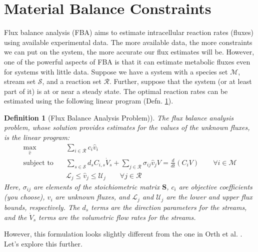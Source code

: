 \documentclass{article}[11pt]
\newtheorem{defn}{Definition}
\begin{document}
\section{Material Balance Constraints}\label{sec-material-balance}
Flux balance analysis (FBA) aims to estimate intracellular reaction rates (fluxes) using available experimental data.
The more available data, the more constraints we can put on the system, the more accurate our flux estimates will be.
However, one of the powerful aspects of FBA is that it can estimate metabolic fluxes even for systems with little data.
Suppose we have a system with a species set $\mathcal{M}$, stream set $\mathcal{S}$, and a reaction set $\mathcal{R}$. 
Further, suppose that the system (or at least part of it) is at or near a steady state. 
The optimal reaction rates can be estimated using the following linear program (Defn. \ref{defn-fba-concentration}).
\begin{mdframed}
\begin{defn}[Flux Balance Analysis Problem)]\label{defn-fba-concentration}
The flux balance analysis problem, whose solution provides estimates for the values of the unknown fluxes, is the linear program: 
\begin{align*}
\max_{\hat{v}}\quad&  \sum_{i\in\mathcal{R}}c_{i}\hat{v}_{i}\\
\text{subject to}\quad & \sum_{s\in\mathcal{S}}d_{s}C_{i,s}\dot{V}_{s} + \sum_{j\in\mathcal{R}}\sigma_{ij}\hat{v}_{j}V = \frac{d}{dt}\left(C_{i}V\right)\qquad\forall{i\in\mathcal{M}}\\
& \mathcal{L}_{j}\leq\hat{v}_{j}\leq\mathcal{U}_{j}\qquad\forall{j\in\mathcal{R}}
\end{align*}
Here, $\sigma_{ij}$ are elements of the stoichiometric matrix $\mathbf{S}$, $c_{i}$ are objective coefficients (you choose), $\hat{v}_{i}$ are unknown fluxes, and $\mathcal{L}_{j}$ and $\mathcal{U}_{j}$ are the lower and upper flux bounds, respectively.
The $d_{s}$ terms are the direction parameters for the streams, and the $\dot{V}_{s}$ terms are the volumetric flow rates for the streams. 
\end{defn}
\end{mdframed}
However, this formulation looks slightly different from the one in Orth et al. \cite{Orth:2010aa}.
Let's explore this further.
\end{document}
